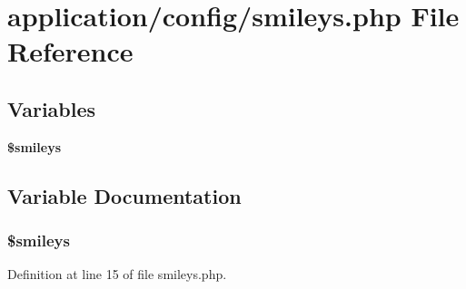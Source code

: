 \section{application/config/smileys.php File Reference}
\label{smileys_8php}
\subsection*{Variables}
\begin{DoxyCompactItemize}
\item 
{\bf \$smileys}
\end{DoxyCompactItemize}


\subsection{Variable Documentation}
\subsubsection[{\$smileys}]{\setlength{\rightskip}{0pt plus 5cm}\$smileys}\label{smileys_8php_a3f21d1c0fb54cb2010e7c7004f29f74c}


Definition at line 15 of file smileys.\-php.

